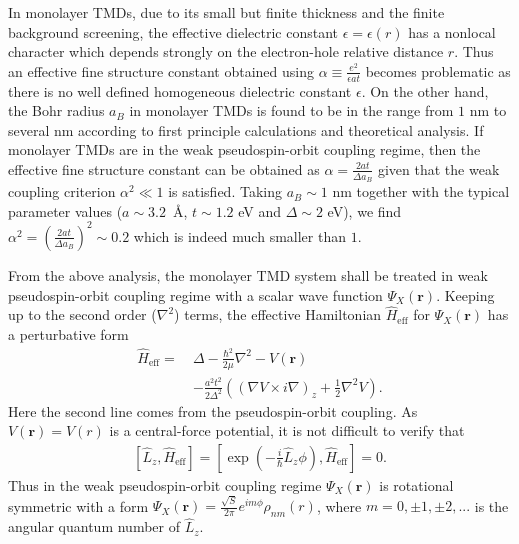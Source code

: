 \documentclass[prb,twocolumn,amsmath,amssymb,superscriptaddress,showpacs]{revtex4}
\begin{document}
In monolayer TMDs, due to its small but finite thickness and the finite background screening, the effective dielectric constant $\epsilon=\epsilon(r)$ has a nonlocal character which depends strongly on the electron-hole relative distance $r$.\cite{Louie dielectric dependence PRB16} Thus an effective fine structure constant obtained using $\alpha\equiv\frac{e^{2}}{\epsilon at}$ becomes problematic as there is no well defined homogeneous dielectric constant $\epsilon$. On the other hand, the Bohr radius $a_{B}$ in monolayer TMDs is found to be in the range from $1$ nm to several nm according to first principle calculations and theoretical analysis. If monolayer TMDs are in the weak pseudospin-orbit coupling regime, then the effective fine structure constant can be obtained as $\alpha=\frac{2at}{\Delta a_{B}}$ given that the weak coupling criterion $\alpha^{2}\ll 1$ is satisfied. Taking $a_{B}\sim1$ nm together with the typical parameter values ($a\sim3.2$~\AA, $t\sim1.2$ eV and $\Delta\sim2$ eV), we find $\alpha^{2}=\left(\frac{2at}{\Delta a_{B}}\right)^{2}\sim0.2$ which is indeed much smaller than $1$. 

From the above analysis, the monolayer TMD system shall be treated in weak pseudospin-orbit coupling regime with a scalar wave function $\Psi_{X}(\mathbf{r})$. Keeping up to the second order ($\nabla^{2}$) terms, the effective Hamiltonian $\hat{H}_\textrm{eff}$ for $\Psi_{X}(\mathbf{r})$ has a perturbative form~\cite{Di Xiao Berry phase and exciton 2015}
\begin{align}
\hat{H}_\textrm{eff}=~&\Delta-\frac{\hbar^{2}}{2\mu}\nabla^{2}-V(\mathbf{r}) \nonumber\\
&-\frac{a^{2}t^{2}}{2\Delta^{2}}\left(\left(\nabla V\times i\nabla\right)_{z}+\frac{1}{2}\nabla^{2}V\right). \label{Wannier rspace}
\end{align}
Here the second line comes from the pseudospin-orbit coupling. As $V(\mathbf{r})=V(r)$ is a central-force potential, it is not difficult to verify that 
\begin{align}
\left[\hat{L}_{z}, \hat{H}_\textrm{eff}\right]=\left[\exp\left(-\frac{i}{\hbar}\hat{L}_{z}\phi\right), \hat{H}_\textrm{eff}\right]=0. \label{LzCommu}
\end{align} 
Thus in the weak pseudospin-orbit coupling regime $\Psi_{X}(\mathbf{r})$ is rotational symmetric with a form $\Psi_{X}(\mathbf{r})=\frac{\sqrt{S}}{2\pi}e^{im\phi}\rho_{nm}(r)$, where $m=0, \pm1, \pm2,...$ is the angular quantum number of $\hat{L}_{z}$.
\end{document}
